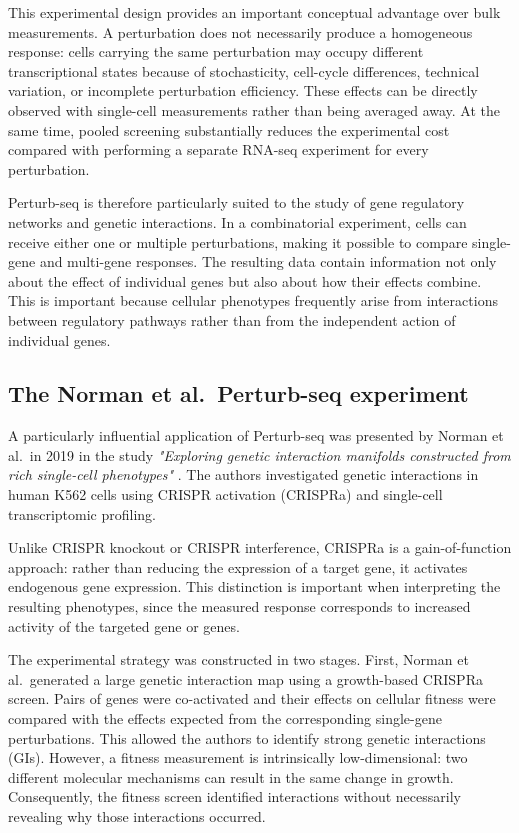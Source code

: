 \documentclass[11pt,a4paper]{article}
\begin{document}
This experimental design provides an important conceptual advantage over bulk
measurements. A perturbation does not necessarily produce a homogeneous
response: cells carrying the same perturbation may occupy different
transcriptional states because of stochasticity, cell-cycle differences,
technical variation, or incomplete perturbation efficiency. These effects can
be directly observed with single-cell measurements rather than being averaged
away. At the same time, pooled screening substantially reduces the experimental
cost compared with performing a separate RNA-seq experiment for every
perturbation.

Perturb-seq is therefore particularly suited to the study of gene regulatory
networks and genetic interactions. In a combinatorial experiment, cells can
receive either one or multiple perturbations, making it possible to compare
single-gene and multi-gene responses. The resulting data contain information
not only about the effect of individual genes but also about how their effects
combine. This is important because cellular phenotypes frequently arise from
interactions between regulatory pathways rather than from the independent
action of individual genes.

\subsection{The Norman et al.\ Perturb-seq experiment}

A particularly influential application of Perturb-seq was presented by Norman
et al.\ in 2019 in the study \textit{"Exploring genetic interaction manifolds
	constructed from rich single-cell phenotypes"} \cite{norman2019}. The authors
investigated genetic interactions in human K562 cells using CRISPR activation
(CRISPRa) and single-cell transcriptomic profiling. 

Unlike CRISPR knockout or CRISPR interference, CRISPRa is a gain-of-function approach: rather than
reducing the expression of a target gene, it activates endogenous gene
expression. This distinction is important when interpreting the resulting
phenotypes, since the measured response corresponds to increased activity of
the targeted gene or genes.

The experimental strategy was constructed in two stages. First, Norman et
al.\ generated a large genetic interaction map using a growth-based CRISPRa
screen. Pairs of genes were co-activated and their effects on cellular fitness
were compared with the effects expected from the corresponding single-gene
perturbations. This allowed the authors to identify strong genetic interactions
(GIs). However, a fitness measurement is intrinsically low-dimensional: two
different molecular mechanisms can result in the same change in growth.
Consequently, the fitness screen identified interactions without necessarily
revealing why those interactions occurred.
\end{document}
